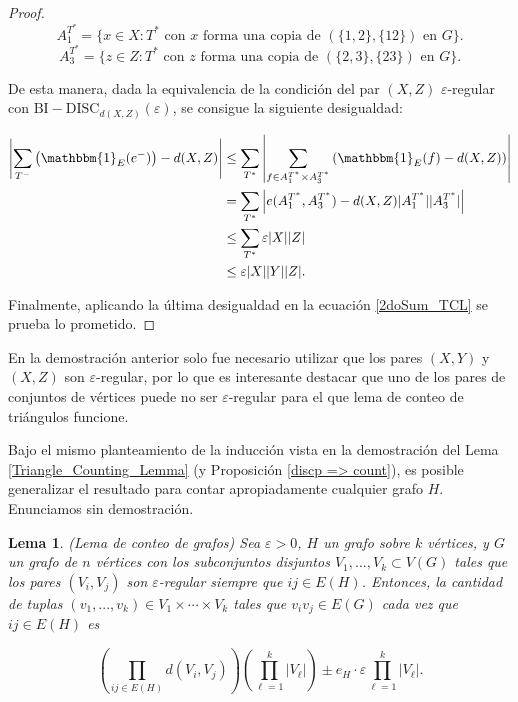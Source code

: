 \documentclass{article}[14pts]
\newtheorem{lema}{Lema}
\newcommand{\bidisc}{\mathrm{BI-DISC}}
\let\varepsilon=\varepsilon
\begin{document}
\begin{proof}
    \[
        A_{1}^{T^{*}} = \lbrace x\in X: T^{*} \text{ con } x \text{ forma una copia de } (\lbrace 1,2\rbrace, \lbrace 12\rbrace) \text{ en } G\rbrace.
    \]
    \[
        A_{3}^{T^{*}} = \lbrace z\in Z: T^{*} \text{ con } z \text{ forma una copia de } (\lbrace 2,3\rbrace, \lbrace 23\rbrace) \text{ en } G\rbrace.
    \]\medskip

    De esta manera, dada la equivalencia de la condición del par $(X,Z)$ $\varepsilon$-regular con $\bidisc_{d(X,Z)}(\varepsilon)$, se consigue la siguiente desigualdad:\medskip
    
    \begin{align*}
        \left| \sum_{T^{-}} \left( \mathbbm{1}_{E}(e^{-})\right) - d(X,Z)\right| &\leq \sum_{T^{*}} \left| \sum_{f\in A_{1}^{T^{*}}\times A_{3}^{T^{*}}} \left( \mathbbm{1}_{E}(f) - d(X,Z)\right)\right|\\
        &= \sum_{T^{*}} \left| e(A_{1}^{T^{*}}, A_{3}^{T^{*}}) - d(X,Z)|A_{1}^{T^{*}}||A_{3}^{T^{*}}|\right|\\
        &\leq \sum_{T^{*}} \varepsilon |X||Z|\\
        &\leq \varepsilon |X||Y||Z|.
    \end{align*}\medskip

    Finalmente, aplicando la última desigualdad en la ecuación \eqref{2doSum_TCL} se prueba lo prometido.
\end{proof}\medskip

En la demostración anterior solo fue necesario utilizar que los pares $(X,Y)$ y $(X,Z)$ son $\varepsilon$-regular, por lo que es interesante destacar que uno de los pares de conjuntos de vértices puede no ser $\varepsilon$-regular para el que lema de conteo de triángulos funcione.\medskip

Bajo el mismo planteamiento de la inducción vista en la demostración del Lema \ref{Triangle_Counting_Lemma} (y Proposición \ref{discp => count}), es posible generalizar el resultado para contar apropiadamente cualquier grafo $H$. Enunciamos sin demostración.\medskip

\begin{lema} \label{Lema_Conteo_Grafos} (Lema de conteo de grafos)
    Sea $\varepsilon > 0$, $H$ un grafo sobre $k$ vértices, y $G$ un grafo de $n$ vértices con los subconjuntos disjuntos $V_1 ,..., V_k\subset V(G)$ tales que los pares $(V_i, V_j)$ son $\varepsilon$-regular siempre que $ij\in E(H)$. Entonces, la cantidad de tuplas $(v_1,...,v_k)\in V_1\times\cdots\times V_k$ tales que $v_i v_j\in E(G)$ cada vez que $ij\in E(H)$ es\medskip
    
    \begin{equation*}
        \left( \prod_{ij\in E(H)} d(V_i, V_j)\right) \left( \prod_{\ell=1}^{k}|V_{\ell}|\right) \pm e_H\cdot \varepsilon \prod_{\ell = 1}^{k}|V_{\ell}|.
    \end{equation*}
\end{lema}\medskip
\end{document}
